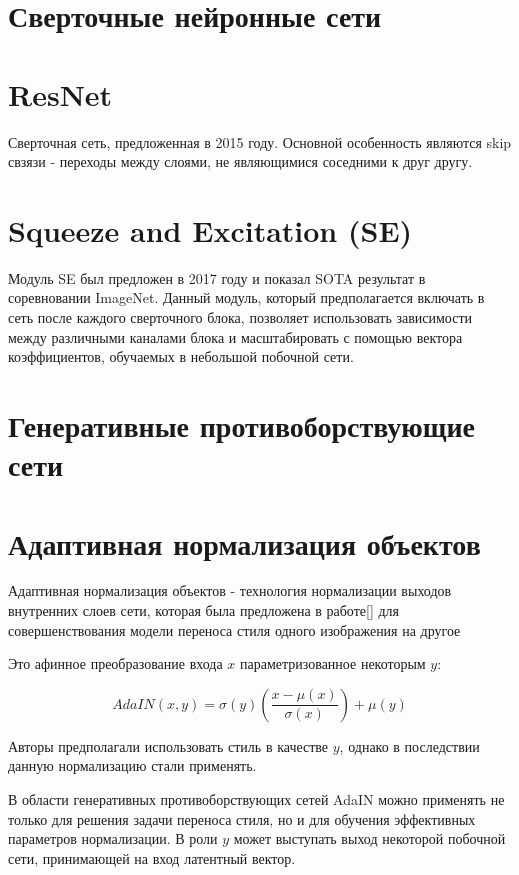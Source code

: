 \section{Сверточные нейронные сети}

\section{ResNet}

Сверточная сеть, предложенная в 2015 году. Основной особенность являются skip свзязи - переходы между слоями, не являющимися соседними к друг другу.

\section{Squeeze and Excitation (SE)}

Модуль SE был предложен в 2017 году и показал SOTA результат в соревновании ImageNet. Данный модуль, который предполагается включать в сеть после каждого сверточного блока, позволяет использовать зависимости между различными каналами блока и масштабировать с помощью вектора коэффициентов, обучаемых в небольшой побочной сети.

\section{Генеративные противоборствующие сети}


\section{Адаптивная нормализация объектов}

Адаптивная нормализация объектов - технология нормализации выходов внутренних слоев сети, которая была предложена в работе[] для совершенствования модели переноса стиля одного изображения на другое

Это афинное преобразование входа $x$ параметризованное некоторым $y$:

\begin{equation}
AdaIN(x, y) = \sigma(y)(\dfrac{x - \mu(x)}{\sigma(x)}) + \mu(y) \label{eq:adain}
\end{equation}

Авторы предполагали использовать стиль в качестве $y$, однако в последствии данную нормализацию стали применять.

В области генеративных противоборствующих сетей AdaIN можно применять не только для решения задачи переноса стиля, но и для обучения эффективных параметров нормализации. В роли $y$ может выступать выход некоторой побочной сети, принимающей на вход латентный вектор.